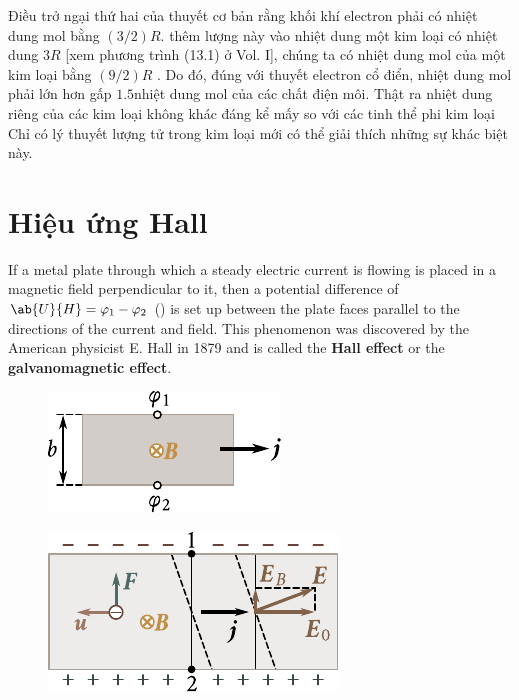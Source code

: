 Điều trở ngại thứ hai của thuyết cơ bản rằng khối khí electron phải có nhiệt dung mol bằng  $(3/2)R$.
thêm lượng này vào nhiệt dung một kim loại có nhiệt dung $3R$ [xem phương trình (13.1) ở Vol. I], chúng ta có nhiệt dung mol của một kim loại bằng $(9/2)R$ .
Do đó, đúng với thuyết electron cổ điển, nhiệt dung mol phải lớn hơn gấp  $1.5$nhiệt dung mol của các chất điện môi.
Thật ra nhiệt dung riêng của các kim loại không khác đáng kể mấy so với các tinh thể phi kim loại
Chỉ có lý thuyết lượng tử trong kim loại mới có thể giải thích những sự khác biệt này.

\section{Hiệu ứng Hall}\label{sec:11_3}

If a metal plate through which a steady electric current is flowing is placed in a magnetic field perpendicular to it, then a potential difference of $\ab{U}{H} = \varphi_1 - \varphi_2$ () is set up between the plate faces parallel to the directions of the current and field.
This phenomenon was discovered by the American physicist E. Hall in 1879 and is called the \textbf{Hall effect} or the \textbf{galvanomagnetic effect}.

\begin{figure}[!htb]
	\begin{minipage}[t]{0.48\linewidth}
		\begin{center}
			\includegraphics[scale=1]{figures/ch_11/fig_11_2.pdf}
			\caption[]{}
			\label{fig:11_2}
		\end{center}
	\end{minipage}
	\hfill{ }%
	\begin{minipage}[t]{0.48\linewidth}
		\begin{center}
			\includegraphics[scale=1]{figures/ch_11/fig_11_3.pdf}
			\caption[]{}
			\label{fig:11_3}
		\end{center}
	\end{minipage}
\vspace{-0.4cm}
\end{figure}

